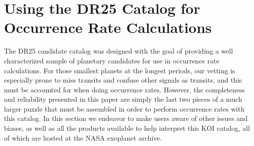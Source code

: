 \section{Using the DR25 Catalog for Occurrence Rate Calculations}
\label{s:occurates}
The DR25 candidate catalog was designed with the goal of providing a well characterized sample of planetary candidates for use in occurrence rate calculations.  For those smallest planets at the longest periods, our vetting is especially prone to miss transits and confuse other signals as transits, and this must be accounted for when doing occurrence rates.  However, the completeness and reliability presented in this paper are simply the last two pieces of a much larger puzzle that must be assembled in order to perform occurrence rates with this catalog.  In this section we endeavor to make users aware of other issues and biases, as well as all the products available to help interpret this KOI catalog, all of which are hosted at the NASA exoplanet archive. 


